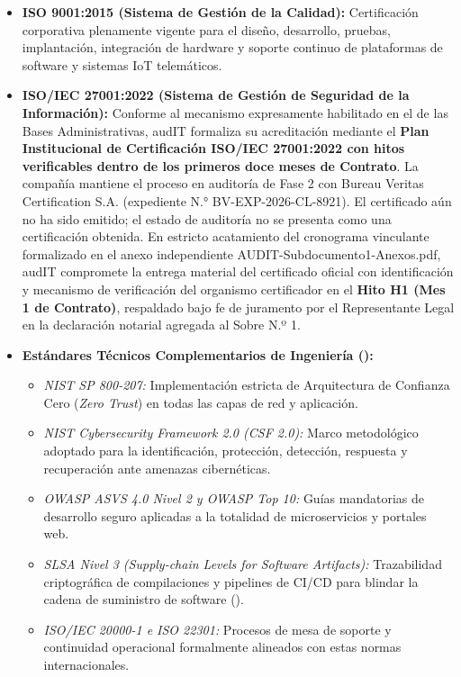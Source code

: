\begin{itemize}
  \item \textbf{ISO 9001:2015 (Sistema de Gestión de la Calidad):} Certificación corporativa plenamente vigente para el diseño, desarrollo, pruebas, implantación, integración de hardware y soporte continuo de plataformas de software y sistemas IoT telemáticos.
  \item \textbf{ISO/IEC 27001:2022 (Sistema de Gestión de Seguridad de la Información):} Conforme al mecanismo expresamente habilitado en el  de las Bases Administrativas, audIT formaliza su acreditación mediante el \textbf{Plan Institucional de Certificación ISO/IEC 27001:2022 con hitos verificables dentro de los primeros doce meses de Contrato}. La compañía mantiene el proceso en auditoría de Fase 2 con Bureau Veritas Certification S.A. (expediente N.° BV-EXP-2026-CL-8921). El certificado aún no ha sido emitido; el estado de auditoría no se presenta como una certificación obtenida. En estricto acatamiento del cronograma vinculante formalizado en el anexo independiente AUDIT-Subdocumento1-Anexos.pdf, audIT compromete la entrega material del certificado oficial con identificación y mecanismo de verificación del organismo certificador en el \textbf{Hito H1 (Mes 1 de Contrato)}, respaldado bajo fe de juramento por el Representante Legal en la declaración notarial agregada al Sobre N.º 1.
  \item \textbf{Estándares Técnicos Complementarios de Ingeniería ():}
  \begin{itemize}
    \item \textit{NIST SP 800-207:} Implementación estricta de Arquitectura de Confianza Cero (\textit{Zero Trust}) en todas las capas de red y aplicación.
    \item \textit{NIST Cybersecurity Framework 2.0 (CSF 2.0):} Marco metodológico adoptado para la identificación, protección, detección, respuesta y recuperación ante amenazas cibernéticas.
    \item \textit{OWASP ASVS 4.0 Nivel 2 y OWASP Top 10:} Guías mandatorias de desarrollo seguro aplicadas a la totalidad de microservicios y portales web.
    \item \textit{SLSA Nivel 3 (Supply-chain Levels for Software Artifacts):} Trazabilidad criptográfica de compilaciones y pipelines de CI/CD para blindar la cadena de suministro de software ().
    \item \textit{ISO/IEC 20000-1 e ISO 22301:} Procesos de mesa de soporte y continuidad operacional formalmente alineados con estas normas internacionales.

\end{itemize}
\end{itemize}
